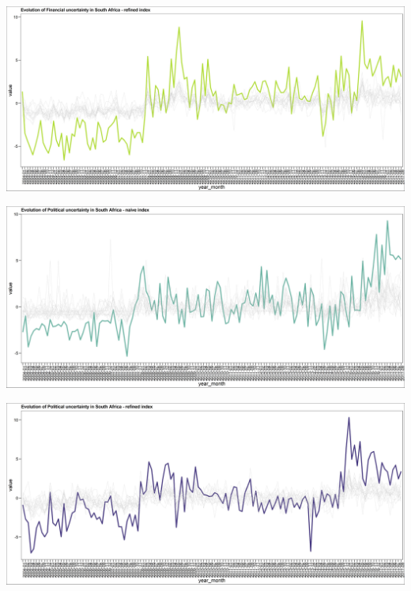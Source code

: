 \documentclass[11pt,preprint, authoryear]{elsarticle}
\let\origfigure\figure
\let\endorigfigure\endfigure
\renewenvironment{figure}[1][2] {
    \expandafter\origfigure\expandafter[H]
} {
    \endorigfigure
}
\numberwithin{equation}{section}
\numberwithin{figure}{section}
\numberwithin{table}{section}
\begin{document}
\begin{figure}
	\centering
	\includegraphics[width=\linewidth, keepaspectratio]{bin/financial_comp_refine}\\
	\caption{Composite Financial market uncertainty refined index. \label{fig_fin_comp_r}}
\end{figure}

\begin{figure}
	\centering
	\includegraphics[width=\linewidth, keepaspectratio]{bin/pol_comp_naive}\\
	\caption{Composite Political uncertainty naive index. \label{fig_pol_comp_n}}
\end{figure}

\begin{figure}
	\centering
	\includegraphics[width=\linewidth, keepaspectratio]{bin/pol_comp_refine}\\
	\caption{Composite Political uncertainty refined index. \label{fig_pol_comp_r}}
\end{figure}
\end{document}
